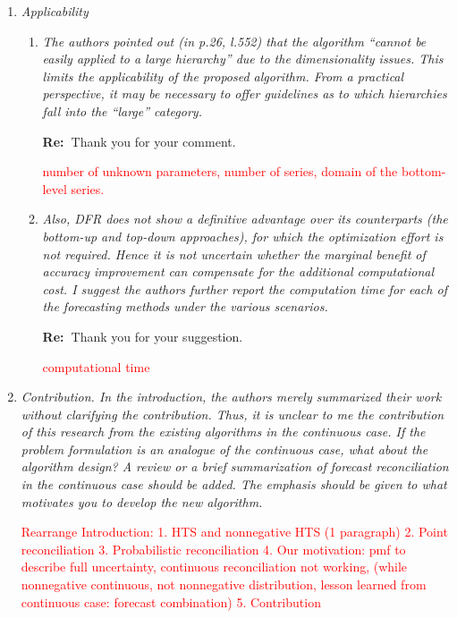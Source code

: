 \documentclass[11pt,a4paper]{article}
\newcommand{\RE}[2][Re:~]{{\color{blue}\textbf{#1}#2}}
\begin{document}
\begin{enumerate}%
\item \textit{Applicability}

  \begin{enumerate}
    \item \textit{The authors pointed out (in p.26, l.552) that the algorithm ``cannot be easily applied to a large hierarchy'' due to the dimensionality issues. This limits the applicability of the proposed algorithm. From a practical perspective, it may be necessary to offer guidelines as to which hierarchies fall into the ``large'' category. }

    \RE{Thank you for your comment. }

    \textcolor{red}{number of unknown parameters, number of series, domain of the bottom-level series.}

    \item \textit{Also, DFR does not show a definitive advantage over its counterparts (the bottom-up and top-down approaches), for which the optimization effort is not required. Hence it is not uncertain whether the marginal benefit of accuracy improvement can compensate for the additional computational cost. I suggest the authors further report the computation time for each of the forecasting methods under the various scenarios.}

    \RE{Thank you for your suggestion.}

    \textcolor{red}{computational time}


  \end{enumerate}

\item \textit{Contribution. In the introduction, the authors merely summarized their work without clarifying the contribution. Thus, it is unclear to me the contribution of this research from the existing algorithms in the continuous case. If the problem formulation is an analogue of the continuous case, what about the algorithm design? A review or a brief summarization of forecast reconciliation in the continuous case should be added. The emphasis should be given to what motivates you to develop the new algorithm.}

\textcolor{red}{Rearrange Introduction:
1. HTS and nonnegative HTS (1 paragraph)
2. Point reconciliation
3. Probabilistic reconciliation
4. Our motivation: pmf to describe full uncertainty, continuous reconciliation not working, (while nonnegative continuous, not nonnegative distribution, lesson learned from continuous case: forecast combination)
5. Contribution
}



\end{enumerate}
\end{document}

